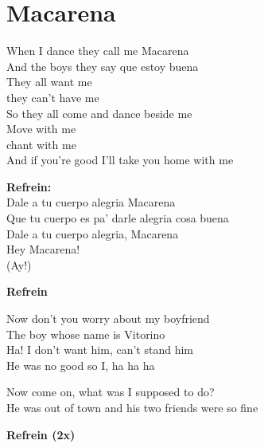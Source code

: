 \section{Macarena}
When I dance they call me Macarena\\
And the boys they say que estoy buena\\
They all want me\\
they can't have me\\
So they all come and dance beside me\\
Move with me\\
chant with me\\
And if you're good I'll take you home with me

\textbf{Refrein:}\\
Dale a tu cuerpo alegria Macarena\\
Que tu cuerpo es pa' darle alegria cosa buena\\
Dale a tu cuerpo alegria, Macarena\\
Hey Macarena!\\
(Ay!)

\textbf{Refrein}

Now don't you worry about my boyfriend\\
The boy whose name is Vitorino\\
Ha! I don't want him, can't stand him\\
He was no good so I, ha ha ha

Now come on, what was I supposed to do?\\
He was out of town and his two friends were so fine

\textbf{Refrein (2x)}
